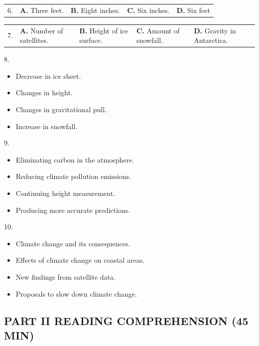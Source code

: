 \documentclass[UTF8,11pt]{ctexart}
\begin{document}
\noindent\begin{tabularx}{\linewidth}{@{}lXXXX@{}}6. & \textbf{A.} Three feet. & \textbf{B.} Eight inches. & \textbf{C.} Six inches. & \textbf{D.} Six feet\\\end{tabularx}\par

\noindent\begin{tabularx}{\linewidth}{@{}lXXXX@{}}7. & \textbf{A.} Number of satellites. & \textbf{B.} Height of ice surface. & \textbf{C.} Amount of snowfall. & \textbf{D.} Gravity in Antarctica.\\\end{tabularx}\par

8.


\begin{itemize}[leftmargin=2em,itemsep=.2em,topsep=.4em]\item[A.] Decrease in ice sheet.
\item[B.] Changes in height.
\item[C.] Changes in gravitational pull.
\item[D.] Increase in snowfall.
\end{itemize}

9.


\begin{itemize}[leftmargin=2em,itemsep=.2em,topsep=.4em]\item[A.] Eliminating carbon in the atmosphere.
\item[B.] Reducing climate pollution emissions.
\item[C.] Continuing height measurement.
\item[D.] Producing more accurate predictions.
\end{itemize}

10.


\begin{itemize}[leftmargin=2em,itemsep=.2em,topsep=.4em]\item[A.] Climate change and its consequences.
\item[B.] Effects of climate change on coastal areas.
\item[C.] New findings from satellite data.
\item[D.] Proposals to slow down climate change.
\end{itemize}

\subsection*{\textbf{PART II READING COMPREHENSION (45 MIN)}}
\end{document}
